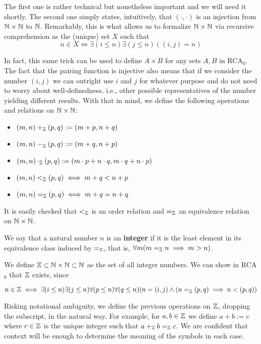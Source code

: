 \documentclass[../main.tex]{memoir}
\begin{document}
The first one is rather technical but nonetheless important and we will need it shortly. The second one simply states, intuitively, that $(\cdot, \cdot)$ is an injection from $\Bbb{N} \times \Bbb{N}$ to $\Bbb{N}$. Remarkably, this is what allows us to formalize $\mathbb{N} \times \mathbb{N}$ via recursive comprehension as the (unique) set $X$ such that
\[
  n \in X \iff \exists (i \le n) \exists (j \le n) ((i, j) = n)
\]

In fact, this same trick can be used to define $A \times B$ for any sets $A, B$ in RCA$_0$. \\

The fact that the pairing function is injective also means that if we consider the number $(i, j)$ we can outright use $i$ and $j$ for whatever purpose and do not need to worry about well-definedness, i.e., other possible representatives of the number yielding different results. With that in mind, we define the following operations and relations on $\mathbb{N} \times \mathbb{N}$:

\begin{itemize}
\item $(m, n) +_{\mathbb{Z}} (p, q) := (m + p, n + q)$
\item $(m, n) -_{\mathbb{Z}} (p, q) := (m + q, n + p)$
\item $(m, n) \cdot_{\mathbb{Z}} (p, q) := (m \cdot p + n \cdot q, m \cdot q + n \cdot p)$
\item $(m, n) <_{\mathbb{Z}} (p, q) \iff m + q < n + p$
\item $(m, n) =_{\mathbb{Z}} (p, q) \iff m + q = n + q$
\end{itemize}

It is easily checked that $<_{\mathbb{Z}}$ is an order relation and $=_{\mathbb{Z}}$ an equivalence relation on $\mathbb{N} \times \mathbb{N}$.

\begin{definition}
We say that a natural number $n$ is an \textbf{integer} if it is the least element in its equivalence class induced by $=_{\mathbb{Z}}$, that is, $\forall m (m =_{\mathbb{Z}} n \implies m > n)$.
\end{definition}

We define $\mathbb{Z} \subset \mathbb{N} \times \mathbb{N} \subset \mathbb{N}$ as the set of all integer numbers. We can show in RCA$_0$ that $\mathbb{Z}$ exists, since

\[
  n \in \mathbb{Z} \iff \exists (i \le n) \exists (j \le n) \forall (p \le n) \forall (q \le n) (n = (i, j) \land (n =_{\mathbb{Z}} (p, q) \implies n < (p, q))
\]

Risking notational ambiguity, we define the previous operations on $\mathbb{Z}$, dropping the subscript, in the natural way. For example, for $a, b \in \mathbb{Z}$ we define $a + b := c$ where $c \in \mathbb{Z}$ is the unique integer such that $a +_{\mathbb{Z}} b =_{\mathbb{Z}} c$. We are confident that context will be enough to determine the meaning of the symbols in each case.
\end{document}
